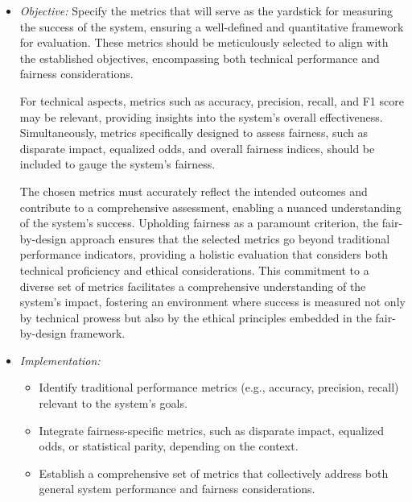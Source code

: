 \begin{itemize}

    \item \emph{Objective:} Specify the metrics that will serve as the yardstick for measuring the success of the system, ensuring a well-defined and quantitative framework for evaluation. These metrics should be meticulously selected to align with the established objectives, encompassing both technical performance and fairness considerations.

    For technical aspects, metrics such as accuracy, precision, recall, and F1 score may be relevant, providing insights into the system's overall effectiveness. Simultaneously, metrics specifically designed to assess fairness, such as disparate impact, equalized odds, and overall fairness indices, should be included to gauge the system's fairness.
    
    The chosen metrics must accurately reflect the intended outcomes and contribute to a comprehensive assessment, enabling a nuanced understanding of the system's success. Upholding fairness as a paramount criterion, the fair-by-design approach ensures that the selected metrics go beyond traditional performance indicators, providing a holistic evaluation that considers both technical proficiency and ethical considerations. This commitment to a diverse set of metrics facilitates a comprehensive understanding of the system's impact, fostering an environment where success is measured not only by technical prowess but also by the ethical principles embedded in the fair-by-design framework.    
    
    \item \emph{Implementation:}
        
    \begin{itemize}
            
        \item Identify traditional performance metrics (e.g., accuracy, precision, recall) relevant to the system's goals.
            
        \item Integrate fairness-specific metrics, such as disparate impact, equalized odds, or statistical parity, depending on the context.
            
        \item Establish a comprehensive set of metrics that collectively address both general system performance and fairness considerations.

    \end{itemize}

\end{itemize}


